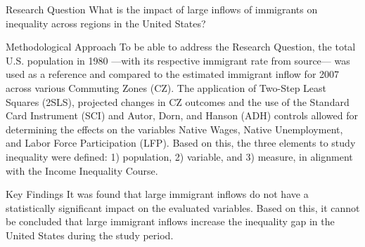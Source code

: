 \begin{frame}

    \begin{block}{Research Question}
    What is the impact of large inflows of immigrants on inequality across regions in the United States?
    \end{block}
    
    \begin{block}{Methodological Approach} 
    To be able to address the Research Question, the total U.S. population in 1980 —with its respective immigrant rate from source— was used as a reference and compared to the estimated immigrant inflow for 2007 across various Commuting Zones (CZ).
    The application of Two-Step Least Squares (2SLS), projected changes in CZ outcomes and the use of the Standard Card Instrument (SCI) and Autor, Dorn, and Hanson (ADH) controls allowed for determining the effects on the variables Native Wages, Native Unemployment, and Labor Force Participation (LFP).
    Based on this, the three elements to study inequality were defined: 1) population, 2) variable, and 3) measure, in alignment with the Income Inequality Course.
    \end{block}
    
    \begin{block}{Key Findings} 
    It was found that large immigrant inflows do not have a statistically significant impact on the evaluated variables. Based on this, it cannot be concluded that large immigrant inflows increase the inequality gap in the United States during the study period.
    \end{block}
    
\end{frame}
